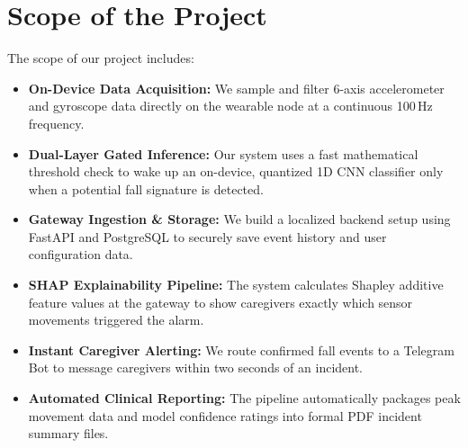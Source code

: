 \section{Scope of the Project}
\label{sec:scope}

The scope of our project includes:

\begin{itemize}
    \item \textbf{On-Device Data Acquisition:} We sample and filter 6-axis accelerometer and gyroscope data directly on the wearable node at a continuous 100\,Hz frequency.

    \item \textbf{Dual-Layer Gated Inference:} Our system uses a fast mathematical threshold check to wake up an on-device, quantized 1D CNN classifier only when a potential fall signature is detected.

    \item \textbf{Gateway Ingestion \& Storage:} We build a localized backend setup using FastAPI and PostgreSQL to securely save event history and user configuration data.

    \item \textbf{SHAP Explainability Pipeline:} The system calculates Shapley additive feature values at the gateway to show caregivers exactly which sensor movements triggered the alarm.

    \item \textbf{Instant Caregiver Alerting:} We route confirmed fall events to a Telegram Bot to message caregivers within two seconds of an incident.

    \item \textbf{Automated Clinical Reporting:} The pipeline automatically packages peak movement data and model confidence ratings into formal PDF incident summary files.
\end{itemize}
